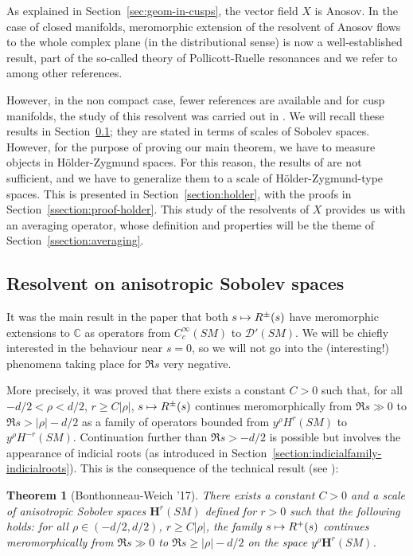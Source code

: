 \documentclass[JEP,XML,SOM,Unicode,NoFloatCountersInSection]{cedram}
\newcommand\mto{\mathchoice{\longmapsto}{\mapsto}{\mapsto}{\mapsto}}
\newcommand{\bH}{\boldsymbol{H}}
\newcommand{\C}{\mathbb{C}}
\theoremstyle{plain}
\newtheorem{theorem}{Theorem}[section]
\theoremstyle{definition}
\begin{document}
As explained in Section~\ref{sec:geom-in-cusps}, the vector field $X$ is Anosov. In the case of closed manifolds, meromorphic extension of the resolvent of Anosov flows to the whole complex plane (in the distributional sense) is now a well-established result, part of the so-called theory of Pollicott-Ruelle resonances and we refer to \cite{Faure-Sjostrand-11,Giulietti-Liverani-Pollicott-13, Faure-Tsuji-13, Dyatlov-Zworski-16,Adam-Baladi-21} among other references.

However, in the non compact case, fewer references are available and for cusp manifolds, the study of this resolvent was carried out in \cite{Bonthonneau-Weich-17}. We will recall these results in Section~\ref{section:sobolev}; they are stated in terms of scales of Sobolev spaces. However, for the purpose of proving our main theorem, we have to measure objects in H\"older-Zygmund spaces. For this reason, the results of \cite{Bonthonneau-Weich-17} are not sufficient, and we have to generalize them to a scale of H\"older-Zygmund-type spaces. This is presented in Section~\ref{section:holder}, with the proofs in Section~\ref{ssection:proof-holder}. This study of the resolvents of $X$ provides us with an averaging operator, whose definition and properties will be the theme of Section~\ref{ssection:averaging}.

\subsection{Resolvent on anisotropic Sobolev spaces}
\label{section:sobolev}

It was the main result in the paper \cite{Bonthonneau-Weich-17} that both $s \mto R^\pm(s)$ have meromorphic extensions to $\C$ as operators from $C^\infty_c(SM)$ to $\mathcal{D}'(SM)$. We will be chiefly interested in the behaviour near $s=0$, so we will not go into the (interesting!) phenomena taking place for $\Re s$ very negative.

More precisely, it was proved that there exists a constant $C>0$ such that, for all $-d/2 < \rho < d/2$, $r\geq C|\rho|$, $s \mto R^\pm(s)$ continues meromorphically from $\Re s \gg 0$ to $\Re s > |\rho| - d/2$ as a family of operators bounded from $y^\rho H^r(SM)$ to $y^\rho H^{-r}(SM)$. Continuation further than $\Re s> -d/2$ is possible but involves the appearance of indicial roots (as introduced in Section~\ref{section:indicialfamily-indicialroots}). This is the consequence of the technical result (see \cite[Th.\,3 \& Lem.\,4.16]{Bonthonneau-Weich-17}):
\begin{theorem}[Bonthonneau-Weich '17]
\label{theorem:bw}
There exists a constant $C > 0$ and a scale of anisotropic Sobolev spaces $\bH^r(SM)$ defined for $r > 0$ such that the following holds: for all $\rho \in (-d/2,d/2)$, $r \geq C|\rho|$, the family $s \mto R^+(s)$ continues meromorphically from $\Re s \gg 0$ to $\Re s \geq |\rho|-d/2$ on the space $y^\rho \bH^r(SM)$.
\end{theorem}
\end{document}
